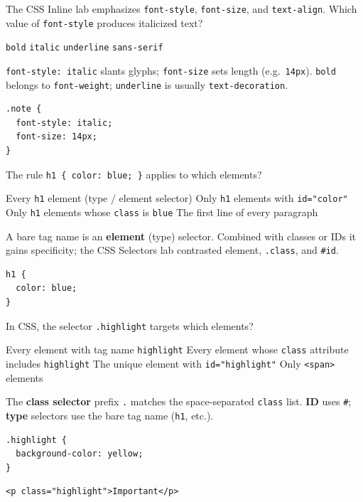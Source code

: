 \question[4]
The CSS Inline lab emphasizes \texttt{font-style}, \texttt{font-size}, and \texttt{text-align}. Which value of \texttt{font-style} produces italicized text?
\begin{choices}
  \choice \texttt{bold}
  \CorrectChoice \texttt{italic}
  \choice \texttt{underline}
  \choice \texttt{sans-serif}
\end{choices}
\begin{solution}
  \texttt{font-style: italic} slants glyphs; \texttt{font-size} sets length (e.g.\ \texttt{14px}). \texttt{bold} belongs to \texttt{font-weight}; \texttt{underline} is usually \texttt{text-decoration}.
\begin{lstlisting}[style=cssexam]
.note {
  font-style: italic;
  font-size: 14px;
}
\end{lstlisting}
\end{solution}

\question[4]
The rule \texttt{h1 \{ color: blue; \}} applies to which elements?
\begin{choices}
  \CorrectChoice Every \texttt{h1} element (type / element selector)
  \choice Only \texttt{h1} elements with \texttt{id="color"}
  \choice Only \texttt{h1} elements whose \texttt{class} is \texttt{blue}
  \choice The first line of every paragraph
\end{choices}
\begin{solution}
  A bare tag name is an \textbf{element} (type) selector. Combined with classes or IDs it gains specificity; the CSS Selectors lab contrasted element, \texttt{.class}, and \texttt{\#id}.
\begin{lstlisting}[style=cssexam]
h1 {
  color: blue;
}
\end{lstlisting}
\end{solution}

\newpage


\question[4]
In CSS, the selector \texttt{.highlight} targets which elements?
\begin{choices}
  \choice Every element with tag name \texttt{highlight}
  \CorrectChoice Every element whose \texttt{class} attribute includes \texttt{highlight}
  \choice The unique element with \texttt{id="highlight"}
  \choice Only \texttt{<span>} elements
\end{choices}
\begin{solution}
  The \textbf{class selector} prefix \texttt{.} matches the space-separated \texttt{class} list. \textbf{ID} uses \texttt{\#}; \textbf{type} selectors use the bare tag name (\texttt{h1}, etc.).
\begin{lstlisting}[style=cssexam]
.highlight {
  background-color: yellow;
}
\end{lstlisting}
\begin{lstlisting}[style=htmlexam]
<p class="highlight">Important</p>
\end{lstlisting}
\end{solution}

